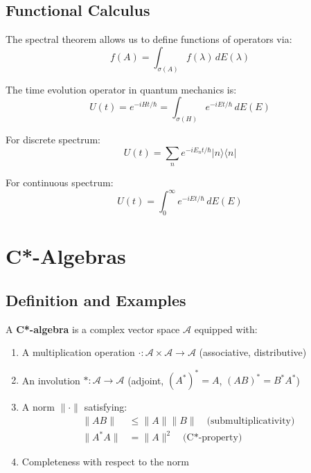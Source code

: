 \subsection{Functional Calculus}

The spectral theorem allows us to define functions of operators via:
\begin{equation}
f(A) = \int_{\sigma(A)} f(\lambda) \, dE(\lambda)
\end{equation}

\begin{example}\label{ex:exponential-operator}
The time evolution operator in quantum mechanics is:
\begin{equation}
U(t) = e^{-iHt/\hbar} = \int_{\sigma(H)} e^{-iEt/\hbar} \, dE(E)
\end{equation}

For discrete spectrum:
\begin{equation}
U(t) = \sum_n e^{-iE_n t/\hbar} |n\rangle\langle n|
\end{equation}

For continuous spectrum:
\begin{equation}
U(t) = \int_0^\infty e^{-iEt/\hbar} \, dE(E)
\end{equation}
\end{example}

\section{C*-Algebras}

\subsection{Definition and Examples}

\begin{definition}[C*-Algebra]\label{def:c-star-algebra}
A \textbf{C*-algebra} is a complex vector space $\mathcal{A}$ equipped with:
\begin{enumerate}
\item A multiplication operation $\cdot: \mathcal{A} \times \mathcal{A} \to \mathcal{A}$ (associative, distributive)
\item An involution $*: \mathcal{A} \to \mathcal{A}$ (adjoint, $(A^*)^* = A$, $(AB)^* = B^*A^*$)
\item A norm $\| \cdot \|$ satisfying:
\begin{align}
\| AB \| &\leq \| A \| \| B \| \quad \text{(submultiplicativity)}\\
\| A^* A \| &= \| A \|^2 \quad \text{(C*-property)}
\end{align}
\item Completeness with respect to the norm
\end{enumerate}
\end{definition}

